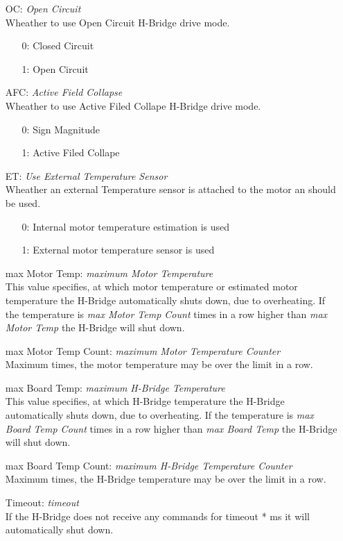 \documentclass{article}
\begin{document}
\begin{itemize}
  \item[OC: ] {\it Open Circuit}\\
    Wheather to use Open Circuit H-Bridge drive mode.
    \begin{itemize}
      \item[0: ] Closed Circuit
      \item[1: ] Open Circuit
    \end{itemize}

  \item[AFC: ] {\it Active Field Collapse}\\
    Wheather to use Active Filed Collape H-Bridge drive mode.
    \begin{itemize}
      \item[0: ] Sign Magnitude
      \item[1: ] Active Filed Collape
    \end{itemize}

  \item[ET: ] {\it Use External Temperature Sensor}\\
    Wheather an external Temperature sensor is attached to the motor
    an should be used.
    \begin{itemize}
      \item[0: ] Internal motor temperature estimation is used
      \item[1: ] External motor temperature sensor is used
    \end{itemize}

  \item[max Motor Temp: ] {\it maximum Motor Temperature}\\
    This value specifies, at which motor temperature or estimated
    motor temperature the H-Bridge
    automatically shuts down, due to overheating.
    If the temperature is {\em max Motor Temp Count} times in a row
    higher than {\em max Motor Temp} the H-Bridge will shut down.

  \item[max Motor Temp Count: ] {\it maximum Motor Temperature Counter}\\
    Maximum times, the motor temperature may be over the limit in a row.

  \item[max Board Temp: ] {\it maximum H-Bridge Temperature}\\
    This value specifies, at which H-Bridge temperature the H-Bridge
    automatically shuts down, due to overheating.
    If the temperature is {\em max Board Temp Count} times in a row
    higher than {\em max Board Temp} the H-Bridge will shut down.
    
  \item[max Board Temp Count: ] {\it maximum H-Bridge Temperature Counter}\\
    Maximum times, the H-Bridge temperature may be over the limit in a row.

  \item[Timeout: ] {\it timeout}\\
    If the H-Bridge does not receive any commands for timeout * ms it
    will automatically shut down.
\end{itemize}
\end{document}
